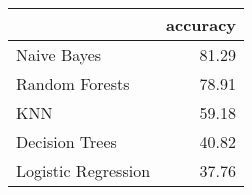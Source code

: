 \begin{tabular}{lr}
\toprule
{} &  accuracy \\
\midrule
Naive Bayes         &     81.29 \\
Random Forests      &     78.91 \\
KNN                 &     59.18 \\
Decision Trees      &     40.82 \\
Logistic Regression &     37.76 \\
\bottomrule
\end{tabular}


